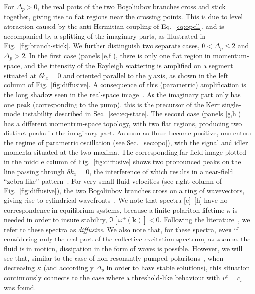 For $\Delta_p > 0$, the real parts of the two Bogoliubov branches
cross and stick together, giving rise to flat regions near the
crossing points. This is due to level attraction caused by the
anti-Hermitian coupling of Eq.~\eqref{eq:opell}, and is accompanied
by a splitting of the imaginary parts, as illustrated in
Fig.~\ref{fig:branch-stick}. We further distinguish two separate
cases, $0 < \Delta_p \le 2$ and $\Delta_p > 2$.
%
In the first case (panels [e,f]), there is only one flat region in
momentum-space, and the intensity of the Rayleigh scattering is
amplified on a segment situated at $\delta k_x = 0$ and oriented
parallel to the $y$ axis, as shown in the left column of
Fig.~\ref{fig:diffusive}. A consequence of this (parametric)
amplification is the long shadow seen in the real-space
image~\cite{Ciuti_2005}. As the imaginary part only has one peak
(corresponding to the pump), this is the precursor of the Kerr
single-mode instability described in Sec.~\ref{sec:eq-state}.
%
The second case (panels [g,h]) has a different momentum-space
topology, with two flat regions, producing two distinct peaks in the
imaginary part. As soon as these become positive, one enters the
regime of parametric oscillation (see Sec.~\ref{sec:opo}), with the
signal and idler momenta situated at the two maxima. The corresponding
far-field image plotted in the middle column of
Fig.~\ref{fig:diffusive} shows two pronounced peaks on the line
passing through $\delta k_x = 0$, the interference of which results in
a near-field ``zebra-like'' pattern~\cite{Ciuti_2005}. For very small
fluid velocities (see right column of Fig.~\ref{fig:diffusive}), the
two Bogoliubov branches cross on a ring of wavevectors, giving rise to
cylindrical wavefronts~\cite{Van_Regemortel_2014}.
%
We note that spectra [e]--[h] have no correspondence in equilibrium
systems, because a finite polariton lifetime $\kappa$ is needed in
order to insure stability, $\Im[\omega^{\pm}(\bm{k})]<0$. Following
the literature~\cite{Carusotto_2013}, we refer to these spectra as
\emph{diffusive}.
%
We also note that, for these spectra, even if considering only the
real part of the collective excitation spectrum, as soon as the fluid
is in motion, dissipation in the form of waves is possible.
%
However, we will see that, similar to the case of non-resonantly
pumped polaritons~\cite{Wouters_2010}, when decreasing $\kappa$ (and
accordingly $\Delta_p$ in order to have stable solutions), this
situation continuously connects to the case where a threshold-like
behaviour with $v^c = c_s$ was found.

